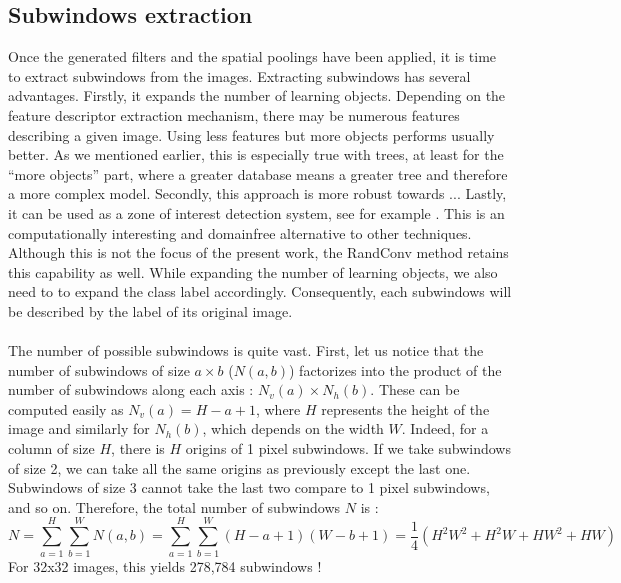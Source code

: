 \documentclass[a4paper]{report}
\begin{document}
		\subsection{Subwindows extraction}
		Once the generated filters and the spatial poolings have been applied, it is time to extract subwindows from the images. Extracting subwindows has several advantages. 
		Firstly, it expands the number of learning objects. Depending on the feature descriptor extraction mechanism, there may be numerous features describing a given image. Using less features but more objects performs usually better. As we mentioned earlier, this is especially true with trees, at least for the ``more objects'' part, where a greater database means a greater tree and therefore a more complex model.
		Secondly, this approach is more robust towards ...%
		Lastly, it can be used as a zone of interest detection system, see for example \cite{maree2006biological}. This is an computationally interesting and domainfree alternative to other techniques. Although this is not the focus of the present work, the RandConv method retains this capability as well.
		While expanding the number of learning objects, we also need to to expand the class label accordingly. Consequently, each subwindows will be described by the label of its original image.
		
		\paragraph{}
		The number of possible subwindows is quite vast. %
		First, let us notice that the number of subwindows of size $a \times b$ ($N(a,b)$) factorizes into the product of the number of subwindows along each axis : $N_v(a) \times N_h(b)$. These can be computed easily as $N_v(a) = H - a + 1$, where $H$ represents the height of the image and similarly for $N_h(b)$, which depends on the width $W$. Indeed, for a column of size $H$, there is $H$ origins of 1 pixel subwindows. If we take subwindows of size 2, we can take all the same origins as previously except the last one. Subwindows of size 3 cannot take the last two compare to 1 pixel subwindows, and so on.
		Therefore, the total number of subwindows $N$ is :
		\[
			N = \sum_{a=1}^H \sum_{b=1}^W N(a,b) = \sum_{a=1}^H \sum_{b=1}^W (H-a+1)(W-b+1) = \frac{1}{4}(H^2W^2 + H^2 W + H W^2 + HW)
		\]
		For 32x32 images, this yields 278,784 subwindows !
		
\end{document}
